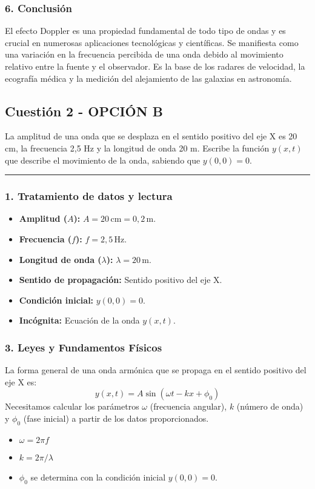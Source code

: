 \subsubsection*{6. Conclusión}
\begin{cajaconclusion}
El efecto Doppler es una propiedad fundamental de todo tipo de ondas y es crucial en numerosas aplicaciones tecnológicas y científicas. Se manifiesta como una variación en la frecuencia percibida de una onda debido al movimiento relativo entre la fuente y el observador. Es la base de los radares de velocidad, la ecografía médica y la medición del alejamiento de las galaxias en astronomía.
\end{cajaconclusion}

\newpage

\subsection{Cuestión 2 - OPCIÓN B}
\label{subsec:2B_2009_jun_ord}

\begin{cajaenunciado}
La amplitud de una onda que se desplaza en el sentido positivo del eje X es 20 cm, la frecuencia 2,5 Hz y la longitud de onda 20 m. Escribe la función $y(x,t)$ que describe el movimiento de la onda, sabiendo que $y(0,0)=0$.
\end{cajaenunciado}
\hrule

\subsubsection*{1. Tratamiento de datos y lectura}
\begin{itemize}
    \item \textbf{Amplitud ($A$):} $A = 20 \, \text{cm} = 0,2 \, \text{m}$.
    \item \textbf{Frecuencia ($f$):} $f = 2,5 \, \text{Hz}$.
    \item \textbf{Longitud de onda ($\lambda$):} $\lambda = 20 \, \text{m}$.
    \item \textbf{Sentido de propagación:} Sentido positivo del eje X.
    \item \textbf{Condición inicial:} $y(0,0)=0$.
    \item \textbf{Incógnita:} Ecuación de la onda $y(x,t)$.
\end{itemize}

\subsubsection*{3. Leyes y Fundamentos Físicos}
La forma general de una onda armónica que se propaga en el sentido positivo del eje X es:
$$ y(x,t) = A \sin(\omega t - kx + \phi_0) $$
Necesitamos calcular los parámetros $\omega$ (frecuencia angular), $k$ (número de onda) y $\phi_0$ (fase inicial) a partir de los datos proporcionados.
\begin{itemize}
    \item $\omega = 2\pi f$
    \item $k = 2\pi / \lambda$
    \item $\phi_0$ se determina con la condición inicial $y(0,0)=0$.
\end{itemize}

